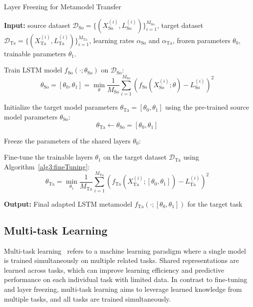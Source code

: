 \begin{algorithm}[ht!]
    \caption{Layer Freezing for Metamodel Transfer}
    \begin{algorithmic}[1] \label{alg3:layerFreezing}
        \STATE \textbf{Input:} source dataset $\mathcal{D}_{\text{So}} = \{(X_{\text{So}}^{(i)}, L_{\text{So}}^{(i)})\}_{i=1}^{M_{\text{So}}}$, target dataset $\mathcal{D}_{\text{Ta}} = \{(X_{\text{Ta}}^{(i)}, L_{\text{Ta}}^{(i)})\}_{i=1}^{M_{\text{Ta}}}$, learning rates $\alpha_{\text{So}}$ and $\alpha_{\text{Ta}}$, frozen parameters $\theta_0$, trainable parameters $\theta_1$.
        
        \STATE Train LSTM model $f_{\text{So}}(\cdot; \theta_{\text{So}})$ on $\mathcal{D}_{\text{So}}$:
        \begin{equation}
            \theta_{\text{So}} = [\theta_0, \theta_1] = \min_{\theta} \frac{1}{M_{\text{So}}} \sum_{i=1}^{M_{\text{So}}} \left( f_{\text{So}}(X_{\text{So}}^{(i)}; \theta) - L_{\text{So}}^{(i)} \right)^2
        \end{equation}
        
        \STATE Initialize the target model parameters $\theta_{\text{Ta}} = [\theta_0, \theta_1]$ using the pre-trained source model parameters $\theta_{\text{So}}$:
        \[
        \theta_{\text{Ta}} \gets \theta_{\text{So}} = [\theta_0, \theta_1]
        \]
        
        \STATE Freeze the parameters of the shared layers $\theta_0$:
        
        \STATE Fine-tune the trainable layers $\theta_1$ on the target dataset $\mathcal{D}_{\text{Ta}}$ using Algorithm~\ref{alg3:fineTuning}:
        \begin{equation}
            \theta_{\text{Ta}} = \min_{\theta_1} \frac{1}{M_{\text{Ta}}} \sum_{i=1}^{M_{\text{Ta}}} \left( f_{\text{Ta}}(X_{\text{Ta}}^{(i)}; [\theta_0, \theta_1]) - L_{\text{Ta}}^{(i)} \right)^2
        \end{equation}
        
        \STATE \textbf{Output:} Final adapted LSTM metamodel $f_{\text{Ta}}(\cdot; [\theta_0, \theta_1])$ for the target task
    \end{algorithmic}
    \end{algorithm}

\subsection{Multi-task Learning}

Multi-task learning~\citep{caruana1997multitask} refers to a machine learning paradigm where a single model is trained simultaneously on multiple related tasks.
Shared representations are learned across tasks, which can improve learning efficiency and predictive performance on each individual task with limited data.
In contrast to fine-tuning and layer freezing, multi-task learning aims to leverage learned knowledge from multiple tasks, and all tasks are trained simultaneously.


